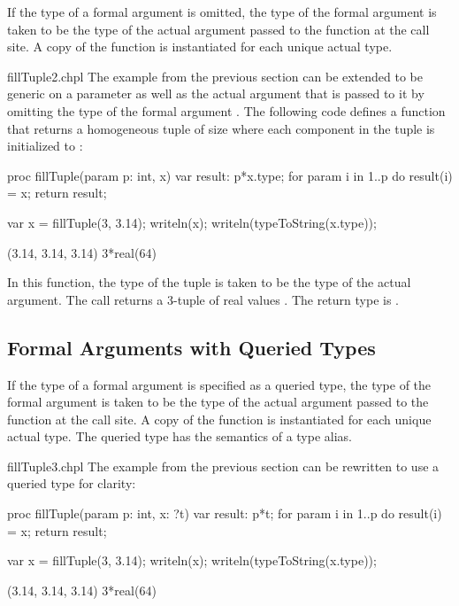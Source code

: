 If the type of a formal argument is omitted, the type of the formal
argument is taken to be the type of the actual argument passed to the
function at the call site.  A copy of the function is instantiated for
each unique actual type.
\begin{chapelexample}{fillTuple2.chpl}
The example from the previous section can be extended to be generic on
a parameter as well as the actual argument that is passed to it by
omitting the type of the formal argument .  The following code
defines a function that returns a homogeneous tuple of size 
where each component in the tuple is initialized to :
\begin{chapel}
proc fillTuple(param p: int, x) {
  var result: p*x.type;
  for param i in 1..p do
    result(i) = x;
  return result;
}
\end{chapel}
\begin{chapelpost}
var x = fillTuple(3, 3.14);
writeln(x);
writeln(typeToString(x.type));
\end{chapelpost}
\begin{chapeloutput}
(3.14, 3.14, 3.14)
3*real(64)
\end{chapeloutput}
In this function, the type of the tuple is taken to be the type of the
actual argument.  The call  returns a 3-tuple
of real values .  The return type is
.
\end{chapelexample}

\subsection{Formal Arguments with Queried Types}
\label{Formal_Arguments_with_Queried_Types}

If the type of a formal argument is specified as a queried type, the
type of the formal argument is taken to be the type of the actual
argument passed to the function at the call site.  A copy of the
function is instantiated for each unique actual type.  The queried
type has the semantics of a type alias.
\begin{chapelexample}{fillTuple3.chpl}
The example from the previous section can be rewritten to use a
queried type for clarity:
\begin{chapel}
proc fillTuple(param p: int, x: ?t) {
  var result: p*t;
  for param i in 1..p do
    result(i) = x;
  return result;
}
\end{chapel}
\begin{chapelpost}
var x = fillTuple(3, 3.14);
writeln(x);
writeln(typeToString(x.type));
\end{chapelpost}
\begin{chapeloutput}
(3.14, 3.14, 3.14)
3*real(64)
\end{chapeloutput}
\end{chapelexample}

